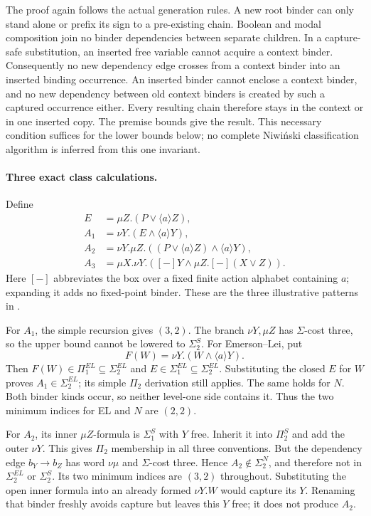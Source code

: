 The proof again follows
the actual generation rules.
A new root binder can
only stand alone or prefix
its sign to a pre-existing
chain. Boolean and modal
composition join no binder
dependencies between separate
children. In a capture-safe
substitution, an inserted
free variable cannot acquire
a context binder.
Consequently no new dependency
edge crosses from a context
binder into an inserted
binding occurrence.
An inserted binder cannot
enclose a context binder,
and no new dependency
between old context binders
is created by such a
captured occurrence either.
Every resulting chain
therefore stays in the
context or in one inserted
copy. The premise bounds
give the result.
This necessary condition
suffices for the lower
bounds below; no complete
Niwi\'nski classification
algorithm is inferred from
this one invariant.

\paragraph{Three exact class calculations.}
Define
\[
\begin{aligned}
 E&=\mu Z.(P\lor\langle a\rangle Z),\\
 A_1&=\nu Y.(E\land\langle a\rangle Y),\\
 A_2&=\nu Y.\mu Z.
          ((P\lor\langle a\rangle Z)\land\langle a\rangle Y),\\
 A_3&=\mu X.\nu Y.
          ([-]Y\land\mu Z.[-](X\lor Z)).
\end{aligned}
\]
Here \([-]\) abbreviates
the box over a fixed
finite action alphabet containing \(a\);
expanding it adds no
fixed-point binder.
These are the three
illustrative patterns in
\cite[\S7]{BradfieldStirling2007}.

For \(A_1\), the simple
recursion gives \((3,2)\).
The branch \(\nu Y,\mu Z\)
has \(\Sigma\)-cost three,
so the upper bound cannot
be lowered to \(\Sigma_2^S\).
For Emerson--Lei, put
\[
 F(W)=\nu Y.(W\land\langle a\rangle Y).
\]
Then \(F(W)\in\Pi_1^{EL}
\subseteq\Sigma_2^{EL}\)
and \(E\in\Sigma_1^{EL}
\subseteq\Sigma_2^{EL}\).
Substituting the closed
\(E\) for \(W\) proves
\(A_1\in\Sigma_2^{EL}\);
its simple \(\Pi_2\)
derivation still applies.
The same holds for \(N\).
Both binder kinds occur,
so neither level-one side
contains it. Thus the
two minimum indices for
EL and \(N\) are \((2,2)\).

For \(A_2\), its inner
\(\mu Z\)-formula is
\(\Sigma_1^S\) with \(Y\)
free. Inherit it into
\(\Pi_2^S\) and add
the outer \(\nu Y\).
This gives \(\Pi_2\)
membership in all three
conventions.
But the dependency edge
\(b_Y\to b_Z\) has
word \(\nu\mu\) and
\(\Sigma\)-cost three.
Hence \(A_2\notin\Sigma_2^N\),
and therefore not in
\(\Sigma_2^{EL}\) or
\(\Sigma_2^S\).
Its two minimum indices
are \((3,2)\) throughout.
Substituting the open
inner formula into an
already formed \(\nu Y.W\)
would capture its \(Y\).
Renaming that binder freshly
avoids capture but leaves
this \(Y\) free; it
does not produce \(A_2\).

